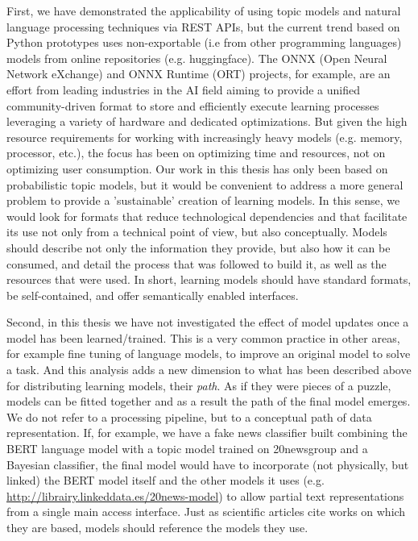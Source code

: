 First, we have demonstrated the applicability of using topic models and natural language processing techniques via REST APIs, but the current trend based on Python prototypes uses non-exportable (i.e from other programming languages) models from online repositories (e.g. huggingface). The ONNX (Open Neural Network eXchange) and ONNX Runtime (ORT) projects, for example, are an effort from leading industries in the AI field aiming to provide a unified community-driven format to store and efficiently execute learning processes leveraging a variety of hardware and dedicated optimizations. But given the high resource requirements for working with increasingly heavy models (e.g. memory, processor, etc.), the focus has been on optimizing time and resources, not on optimizing user consumption. Our work in this thesis has only been based on probabilistic topic models, but it would be convenient to address a more general problem to provide a 'sustainable' creation of learning models. In this sense, we would look for formats that reduce technological dependencies and that facilitate its use not only from a technical point of view, but also conceptually. Models should describe not only the information they provide, but also how it can be consumed, and detail the process that was followed to build it, as well as the resources that were used. In short, learning models should have standard formats, be self-contained, and offer semantically enabled interfaces.

Second, in this thesis we have not investigated the effect of model updates once a model has been learned/trained. This is a very common practice in other areas, for example fine tuning of language models, to improve an original model to solve a task. And this analysis adds a new dimension to what has been described above for distributing learning models, their \textit{path}. As if they were pieces of a puzzle, models can be fitted together and as a result the path of the final model emerges. We do not refer to a processing pipeline, but to a conceptual path of data representation. If, for example, we have a fake news classifier built combining the BERT language model with a topic model trained on 20newsgroup and a Bayesian classifier, the final model would have to incorporate (not physically, but linked) the BERT model itself and the other models it uses (e.g. \url{http://librairy.linkeddata.es/20news-model}) to allow partial text representations from a single main access interface. Just as scientific articles cite works on which they are based, models should reference the models they use. 


